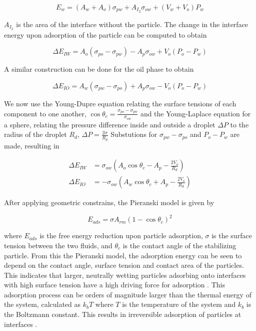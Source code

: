 \begin{equation}
    E_w = (A_w + A_o)\sigma_{pw} + A_{I_2}\sigma_{ow} + (V_w + V_o)P_w
\end{equation}

$A_{I_2}$ is the area of the interface without the particle. The change in the interface energy upon adsorption of the particle can be computed to obtain

\begin{equation}
    \Delta E_{IW} = A_o(\sigma_{po} - \sigma_{pw}) - A_p\sigma_{ow} + V_o(P_o - P_w)
\end{equation}

A similar construction can be done for the oil phase to obtain 

\begin{equation}
    \Delta E_{IO} = A_w(\sigma_{pw} - \sigma_{po}) + A_p\sigma_{ow} - V_o(P_o - P_w)
\end{equation}

We now use the Young-Dupre equation relating the surface tensions of each component to one another, $\cos{\theta_c} = \frac{\sigma_{po} - \sigma_{pw}}{\sigma_{ow}}$ and the
Young-Laplace equation for a sphere, relating the pressure difference inside and outside a droplet $\Delta P$ to the radius of the droplet $R_d$, $\Delta P = \frac{2\sigma}{R_d}$
Substutions for $\sigma_{pw} - \sigma_{po}$ and $P_o - P_w$ are made, resulting in 

\begin{equation}
    \begin{split}
        \Delta E_{IW} &= \sigma_{ow}(A_o\cos{\theta_c} - A_p - \frac{2 V_o}{R_d}) \\
        \Delta E_{IO} &= -\sigma_{ow}(A_w\cos{\theta_c} + A_p - \frac{2 V_o}{R_d})
    \end{split}
\end{equation}

After applying geometric constrains, the Pieranski model is given by 

\begin{equation}
    E_{ads} = \sigma A_{rm} (1 - \cos{\theta_c})^2
\end{equation}

where $E_{ads}$ is the free energy reduction upon particle adsorption, $\sigma$ is the surface tension between the two fluids, and $\theta_c$ is the contact angle of the stabilizing particle. 
From this the Pieranski model, the adsorption energy can be seen to depend on the contact angle, surface tension and contact area of the particles. This indicates that larger, neutrally wetting
particles adsorbing onto interfaces with high surface tension have a high driving force for adsorption \cite{ngai_particle-stabilized_2015,reeves_particle-size_2015}. This adsorption process 
can be orders of magnitude larger than the thermal energy of the system, calculated as $k_b T$ where $T$ is the temperature of the system and $k_b$ is the Boltzmann constant. This results in 
irreversible adsorption of particles at interfaces \cite{binks_pickering_2001}.

